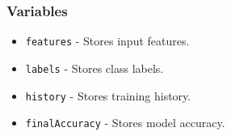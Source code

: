 \subsubsection{Variables}
\begin{itemize}
	\item \texttt{features} - Stores input features.
	\item \texttt{labels} - Stores class labels.
	\item \texttt{history} - Stores training history.
	\item \texttt{finalAccuracy} - Stores model accuracy.
\end{itemize}